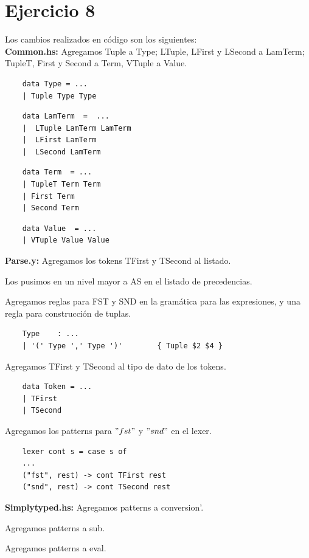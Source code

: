 \documentclass{article}
\begin{document}
	\section*{Ejercicio 8}
	Los cambios realizados en código son los siguientes:\\
	\textbf{Common.hs:} Agregamos Tuple a Type; LTuple, LFirst y LSecond a LamTerm; TupleT, First y Second a Term, VTuple a Value.
	\begin{lstlisting}
	data Type = ...
	| Tuple Type Type
	\end{lstlisting}
	\begin{lstlisting}
	data LamTerm  =  ...
	|  LTuple LamTerm LamTerm
	|  LFirst LamTerm
	|  LSecond LamTerm
	\end{lstlisting}
	\begin{lstlisting}
	data Term  = ...
	| TupleT Term Term
	| First Term
	| Second Term
	\end{lstlisting}
	\begin{lstlisting}
	data Value  = ...
	| VTuple Value Value
	\end{lstlisting}
	\textbf{Parse.y:} Agregamos los tokens TFirst y TSecond al listado.
	
	Los pusimos en un nivel mayor a AS en el listado de precedencias. 
	
	Agregamos reglas para FST y SND en la gramática para las expresiones, y una regla para construcción de tuplas.
	
	\begin{lstlisting}
	Type    : ...
	| '(' Type ',' Type ')'        { Tuple $2 $4 }
	\end{lstlisting}
	Agregamos TFirst y TSecond al tipo de dato de los tokens. 
	\begin{lstlisting}
	data Token = ...
	| TFirst
	| TSecond	
	\end{lstlisting}
	Agregamos los patterns para $"fst"$ y $"snd"$ en el lexer.
	\begin{lstlisting}
	lexer cont s = case s of
	...
	("fst", rest) -> cont TFirst rest
	("snd", rest) -> cont TSecond rest\end{lstlisting}
	\textbf{Simplytyped.hs:} Agregamos patterns a conversion'.
	
	Agregamos patterns a sub.
	
	Agregamos patterns a eval.
	
\end{document}
